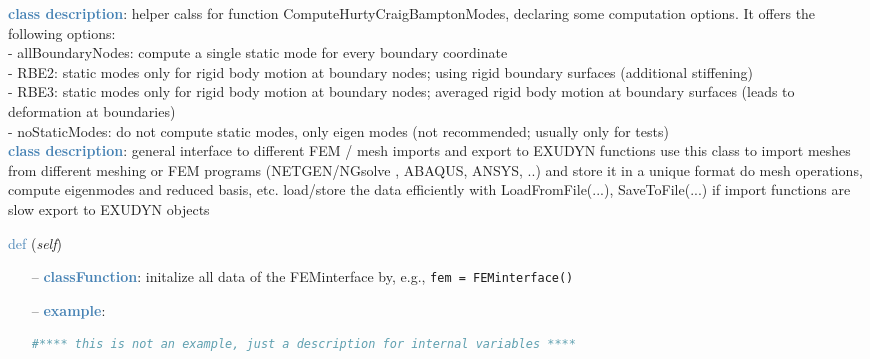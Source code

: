 \begin{itemize}[leftmargin=1.4cm]
\begin{itemize}[leftmargin=1.4cm]
\begin{itemize}[leftmargin=1.4cm]
\begin{itemize}[leftmargin=0.5cm]
\begin{itemize}[leftmargin=1.4cm]
\begin{itemize}[leftmargin=1.4cm]
\begin{itemize}[leftmargin=0.5cm]
%
\noindent\textcolor{steelblue}{{\bf class description}}:  helper calss for function ComputeHurtyCraigBamptonModes, declaring some computation options. It offers the following options:\\
 - allBoundaryNodes:     compute a single static mode for every boundary coordinate\\
 - RBE2:                 static modes only for rigid body motion at boundary nodes; using rigid boundary surfaces (additional stiffening)\\
 - RBE3:                 static modes only for rigid body motion at boundary nodes; averaged rigid body motion at boundary surfaces (leads to deformation at boundaries)\\
 - noStaticModes:        do not compute static modes, only eigen modes (not recommended; usually only for tests)
\vspace{3pt} \\ 
\noindent\textcolor{steelblue}{{\bf class description}}:  general interface to different FEM / mesh imports and export to EXUDYN functions
         use this class to import meshes from different meshing or FEM programs (NETGEN/NGsolve \cite{NGsolve2022}, ABAQUS, ANSYS, ..) and store it in a unique format
         do mesh operations, compute eigenmodes and reduced basis, etc.
         load/store the data efficiently with LoadFromFile(...), SaveToFile(...)  if import functions are slow
         export to EXUDYN objects
\vspace{3pt} \\ 
\begin{flushleft}
\noindent \textcolor{steelblue}{def {\bf {}}}\label{sec:FEM:FEMinterface:__init__}
({\it self})
\end{flushleft}
\setlength{\itemindent}{0.7cm}
\begin{itemize}[leftmargin=0.7cm]
\item[--]\textcolor{steelblue}{\bf classFunction}: initalize all data of the FEMinterface by, e.g., \texttt{fem = FEMinterface()}
\item[--]\textcolor{steelblue}{\bf example}: \vspace{-12pt}\ei\begin{lstlisting}[language=Python, xleftmargin=36pt]
  #**** this is not an example, just a description for internal variables ****

\end{lstlisting}
\end{itemize}
\end{itemize}
\end{itemize}
\end{itemize}
\end{itemize}
\end{itemize}
\end{itemize}
\end{itemize}
